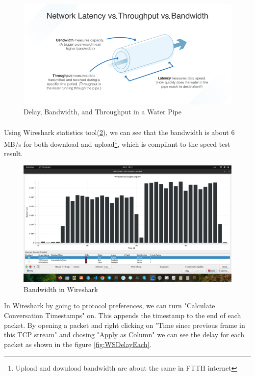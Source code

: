 \documentclass[en]{university}
\begin{document}
\begin{figure}
    \centering
    \includegraphics[width=\textwidth]{./resources/dbt.png}
    \caption{Delay, Bandwidth, and Throughput in a Water Pipe}
    \label{fig:dbt}
\end{figure}

\subsubsection{}
Using Wireshark statistics tool(\ref{fig:WSBandwidth}), we can see that the bandwidth is about 6 MB/s for both download and upload\footnote{Upload and download bandwidth are about the same in FTTH internet}, which is compilant to the speed test result.

\begin{figure}
    \centering
    \includegraphics[width=\textwidth]{./resources/WSBandwidth.png}
    \caption{Bandwidth in Wireshark}
    \label{fig:WSBandwidth}
\end{figure}

In Wireshark by going to protocol preferences, we can turn "Calculate Conversation Timestamps" on. This appends the timestamp to the end of each packet. By opening a packet and right clicking on "Time since previous frame in this TCP stream" and chosing "Apply as Column" we can see the delay for each packet as shown in the figure \ref{fig:WSDelayEach}.
\end{document}
